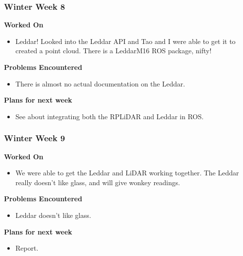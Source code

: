 \documentclass[compsoc,draftclsnofoot,onecolumn,10pt]{IEEEtran}
\begin{document}
\subsubsection*{Winter Week 8}
\textbf{Worked On}
\begin{itemize}
    \item Leddar! Looked into the Leddar API and Tao and I were able to get it to created a point cloud. There is a LeddarM16 ROS package, nifty!
\end{itemize}
\textbf{Problems Encountered}
\begin{itemize}
    \item There is almost no actual documentation on the Leddar.
\end{itemize}
\textbf{Plans for next week}
\begin{itemize}
    \item See about integrating both the RPLiDAR and Leddar in ROS.
\end{itemize}


\subsubsection*{Winter Week 9}
\textbf{Worked On}
\begin{itemize}
    \item We were able to get the Leddar and LiDAR working together. The Leddar really doesn't like glass, and will give wonkey readings.
\end{itemize}
\textbf{Problems Encountered}
\begin{itemize}
    \item Leddar doesn't like glass.
\end{itemize}
\textbf{Plans for next week}
\begin{itemize}
     \item Report.
\end{itemize}
\end{document}
